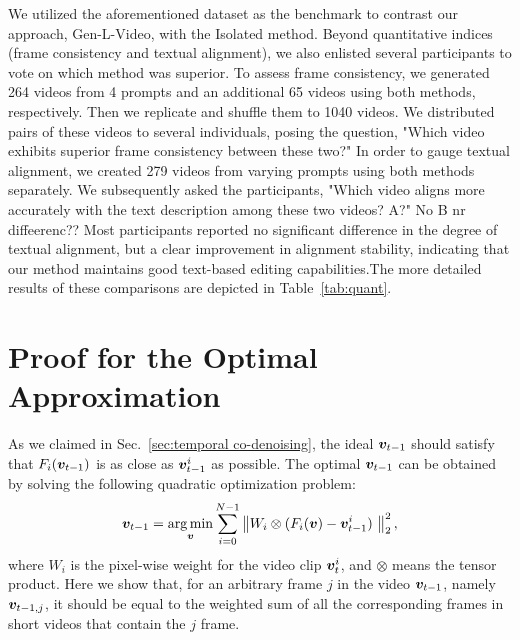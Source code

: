 \documentclass{article}
\begin{document}
We utilized the aforementioned dataset as the benchmark to contrast our approach, Gen-L-Video, with the Isolated method. Beyond quantitative indices (frame consistency and textual alignment), we also enlisted several participants to vote on which method was superior. To assess frame consistency, we generated 264 videos from 4 prompts and an additional 65 videos using both methods, respectively. Then we replicate and shuffle them to 1040 videos. We distributed pairs of these videos to several individuals, posing the question, "Which video exhibits superior frame consistency between these two?" In order to gauge textual alignment, we created 279 videos from varying prompts using both methods separately. We subsequently asked the participants, "Which video aligns more accurately with the text description among these two videos? A?" No B nr diffeerenc?? Most participants reported no significant difference in the degree of textual alignment, but a clear improvement in alignment stability, indicating that our method maintains good text-based editing capabilities.The more detailed results of these comparisons are depicted in Table~\ref{tab:quant}.

\section{Proof for the Optimal Approximation}\label{sec:proof}
As we claimed in Sec.~\ref{sec:temporal co-denoising}, the ideal ${\bm{v}}_{t-1}$ should satisfy that $F_{i}({\bm{v}}_{t-1})$ is as close as ${\bm{v}}_{t-1}^i$ as possible. The optimal ${\bm{v}}_{t-1}$ can be obtained by solving the following quadratic optimization problem:
\begin{align*}
    {\bm{v}}_{t-1} = \mathop{\arg\min}_{{\bm{v}}}\sum_{i=0}^{N-1}\left\|W_i \otimes (F_i({\bm{v}})-{\bm{v}}_{t-1}^i)\ \right\|_2^2,
\end{align*}
where $W_i$ is the pixel-wise weight for the video clip ${\bm{v}}^i_{t}$, and $\otimes$ means the tensor product. Here we show that, for an arbitrary frame $j$ in the video ${\bm{v}}_{t-1}$, namely ${\bm{v}}_{t-1,j}$, it should be equal to the weighted sum of all the corresponding frames in short videos that contain the $j$ frame.
\end{document}
